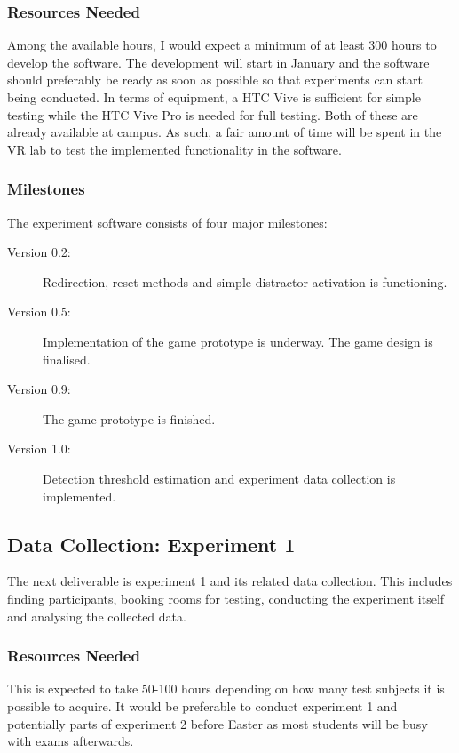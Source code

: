 \subsubsection{Resources Needed}
Among the available hours, I would expect a minimum of at least 300 hours to develop the software. The development will start in January and the software should preferably be ready as soon as possible so that experiments can start being conducted. In terms of equipment, a HTC Vive is sufficient for simple testing while the HTC Vive Pro is needed for full testing. Both of these are already available at campus. As such, a fair amount of time will be spent in the VR lab to test the implemented functionality in the software. 

\subsubsection{Milestones}
The experiment software consists of four major milestones: 

\begin{description}
\item[Version 0.2: ] Redirection, reset methods and simple distractor activation is functioning.
\item[Version 0.5: ] Implementation of the game prototype is underway. The game design is finalised.
\item[Version 0.9: ] The game prototype is finished.
\item[Version 1.0: ] Detection threshold estimation and experiment data collection is implemented. 
\end{description}

\subsection{Data Collection: Experiment 1}
The next deliverable is experiment 1 and its related data collection. This includes finding participants, booking rooms for testing, conducting the experiment itself and analysing the collected data. 

\subsubsection{Resources Needed}
This is expected to take 50-100 hours depending on how many test subjects it is possible to acquire. It would be preferable to conduct experiment 1 and potentially parts of experiment 2 before Easter as most students will be busy with exams afterwards. 

